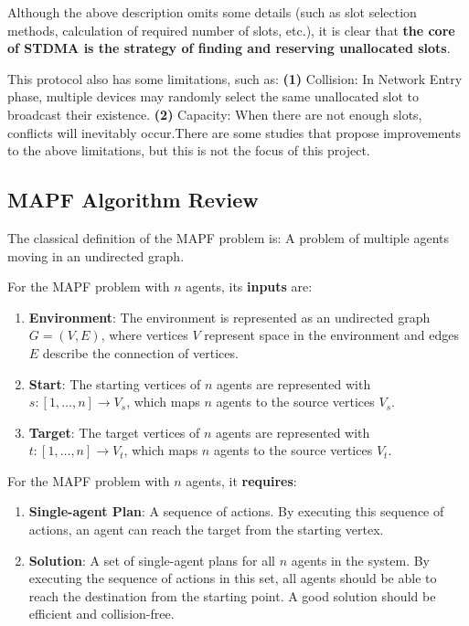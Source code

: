 \documentclass[12pt, oneside]{article}
\begin{document}
Although the above description omits some details (such as slot selection methods, calculation of required number of slots, etc.), it is clear that \textbf{the core of STDMA is the strategy of finding and reserving unallocated slots}.

This protocol also has some limitations, such as: \textbf{(1)} Collision: In Network Entry phase, multiple devices may randomly select the same unallocated slot to broadcast their existence. \textbf{(2)} Capacity: When there are not enough slots, conflicts will inevitably occur.There are some studies that propose improvements to the above limitations\cite{STDMA_improv1,STDMA_improv2}, but this is not the focus of this project.


\subsection{MAPF Algorithm Review}
\label{MAPF_Review}

The classical definition of the MAPF problem is: A problem of multiple agents moving in an undirected graph\cite{MAPF_Deadlock_Explain1}.

For the MAPF problem with $n$ agents, its \textbf{inputs} are:

\begin{enumerate}
    \item \textbf{Environment}: The environment is represented as an undirected graph $G = (V, E)$, where vertices $V$ represent space in the environment and edges $E$ describe the connection of vertices.
    \item \textbf{Start}: The starting vertices of $n$ agents are represented with $s : [1, …, n] \rightarrow V_{s}$, which maps $n$ agents to the source vertices $V_{s}$.
    \item \textbf{Target}: The target vertices of $n$ agents are represented with $t : [1, …, n] \rightarrow V_{t}$, which maps $n$ agents to the source vertices $V_{t}$.
\end{enumerate}

For the MAPF problem with $n$ agents, it \textbf{requires}:

\begin{enumerate}
    \item \textbf{Single-agent Plan}: A sequence of actions. By executing this sequence of actions, an agent can reach the target from the starting vertex.
    \item \textbf{Solution}: A set of single-agent plans for all $n$ agents in the system. By executing the sequence of actions in this set, all agents should be able to reach the destination from the starting point. A good solution should be efficient and collision-free.
\end{enumerate}
\end{document}
